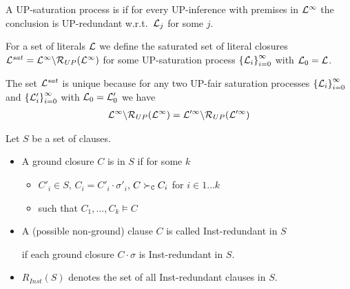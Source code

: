    \begin{definition}[UP-Fairness]
            A UP-saturation process is  if for every UP-inference
            with premises in \( \mathcal{L}^\infty \) the conclusion is UP-redundant
            w.r.t.~\( \mathcal{L}_j \) for some \( j \).
   \end{definition}
   \begin{definition}
            For a set of literals \( \mathcal{L} \) we define
            the saturated set of literal closures
           \( \mathcal{L}^{sat} = \mathcal{L}^\infty\backslash\mathcal{R}_{UP}(\mathcal{L}^\infty) \)
            for some UP-saturation process
           \( {\{ \mathcal{L}_i \}}_{i=0}^\infty \)
            with \( \mathcal{L}_0 = \mathcal{L} \).
   \end{definition}


       \begin{lemma}\cite{GK2004csl}
        The set \( \mathcal{L}^{sat} \) is unique because
        for any two UP-fair saturation processes
        \( {\{ \mathcal{L}_i \}}_{i=0}^\infty \) and
        \( {\{ \mathcal{L}'_i \}}_{i=0}^\infty \)
        with \( \mathcal{L}_0 = \mathcal{L}'_0 \) we have
        \begin{gather*}
            \mathcal{L}^\infty \backslash \mathcal{R}_{UP}(\mathcal{L}^\infty)
            =
            \mathcal{L}'^\infty \backslash \mathcal{R}_{UP}(\mathcal{L}'^\infty)
        \end{gather*}
       \end{lemma}

\begin{definition}\label{def:inst:redundant}

    Let \( S \) be a set of clauses.

   \begin{itemize}
       \item A ground closure \( C \) is  in \( S \)
        if for some \( k \)
       \begin{itemize}
           \item \( C'_i\in S \), \( C_i=C'_i\cdot\sigma'_i \), \( C\mathrel\succ_{\mathtt{C}} C_i \) \hfill for \( i\in 1\ldots k \)
           \item such that \( C_1,\ldots,C_k\models C \)
       \end{itemize}

       \item
        A (possible non-ground) clause \( C \) is called Inst-redundant in \( S \)

    if each ground closure \( C\cdot\sigma \) is Inst-redundant in \( S \).


   \item
   \( R_{Inst}(S) \) denotes the set of all Inst-redundant clauses in \( S \).


   \end{itemize}

\end{definition}

